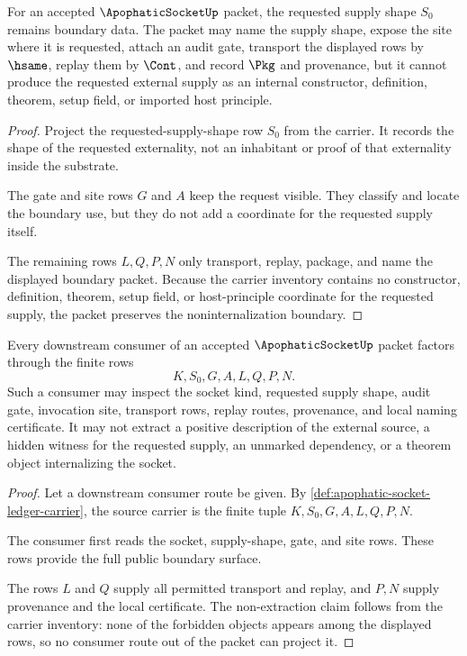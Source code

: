 \begin{theorem}
\label{thm:apophatic-socket-noninternalization-boundary}
For an accepted $\ApophaticSocketUp$ packet, the requested supply shape $S_0$ remains boundary data. The packet may name the supply shape, expose the site where it is requested, attach an audit gate, transport the displayed rows by $\hsame$, replay them by $\Cont$, and record $\Pkg$ and \NameCert{} provenance, but it cannot produce the requested external supply as an internal constructor, definition, theorem, setup field, or imported host principle.
\end{theorem}
\begin{proof}
Project the requested-supply-shape row $S_0$ from the carrier. It records the shape of the requested externality, not an inhabitant or proof of that externality inside the substrate.

The gate and site rows $G$ and $A$ keep the request visible. They classify and locate the boundary use, but they do not add a coordinate for the requested supply itself.

The remaining rows $L,Q,P,N$ only transport, replay, package, and name the displayed boundary packet. Because the carrier inventory contains no constructor, definition, theorem, setup field, or host-principle coordinate for the requested supply, the packet preserves the noninternalization boundary.
\end{proof}

\begin{theorem}
\label{thm:apophatic-socket-consumer-surface}
Every downstream consumer of an accepted $\ApophaticSocketUp$ packet factors through the finite rows
$$
K,S_0,G,A,L,Q,P,N.
$$
Such a consumer may inspect the socket kind, requested supply shape, audit gate, invocation site, transport rows, replay routes, provenance, and local naming certificate. It may not extract a positive description of the external source, a hidden witness for the requested supply, an unmarked dependency, or a theorem object internalizing the socket.
\end{theorem}
\begin{proof}
Let a downstream consumer route be given. By \autoref{def:apophatic-socket-ledger-carrier}, the source carrier is the finite tuple $K,S_0,G,A,L,Q,P,N$.

The consumer first reads the socket, supply-shape, gate, and site rows. These rows provide the full public boundary surface.

The rows $L$ and $Q$ supply all permitted transport and replay, and $P,N$ supply provenance and the local certificate. The non-extraction claim follows from the carrier inventory: none of the forbidden objects appears among the displayed rows, so no consumer route out of the packet can project it.
\end{proof}

